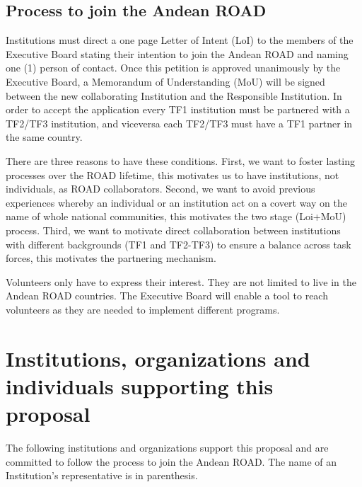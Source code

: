 \documentclass[12pt]{article}
\begin{document}
\subsection*{Process to join the Andean ROAD}

Institutions must direct a one page Letter of Intent (LoI) to the
members of the Executive Board stating their intention to join the
Andean ROAD and naming one (1) person of contact. Once this petition
is approved unanimously by the Executive Board, a Memorandum of
Understanding (MoU) will be signed between the new collaborating Institution
and the Responsible Institution. In order to accept the application
every TF1 institution must be partnered with a TF2/TF3 institution,
and viceversa each TF2/TF3 must have a TF1 partner in the same
country. 

There are three reasons to have these conditions. First, we want to
foster lasting processes over the ROAD lifetime, this motivates us to
have institutions, not individuals, as ROAD collaborators. Second, we want
to avoid previous experiences whereby an individual or an institution
act on a covert way on the name of whole national communities, this
motivates the two stage (Loi+MoU) process. Third, we want to motivate
direct collaboration between institutions with different backgrounds
(TF1 and TF2-TF3) to ensure a balance across task forces, this
motivates the partnering mechanism.  

Volunteers only have to express their interest. They are not limited
to live in the Andean ROAD countries. The Executive Board will enable
a tool to reach volunteers as they are needed to implement different
programs.  


\appendixpage
\appendix
\section{Institutions, organizations and individuals supporting this proposal}

The following institutions and organizations support this proposal and
are committed to follow the process to join the Andean ROAD. The name
of an Institution’s representative is in parenthesis. 
\end{document}
